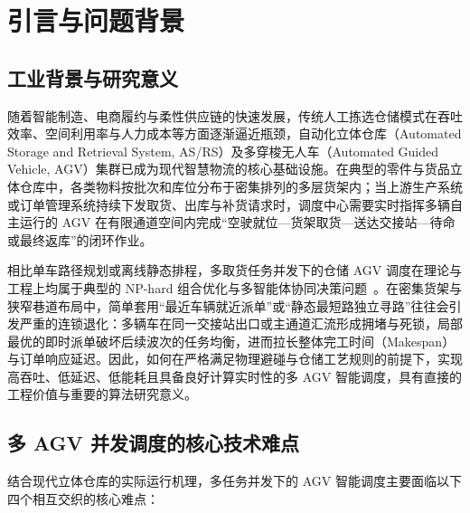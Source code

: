 \section{引言与问题背景}
\label{sec:introduction}

\subsection{工业背景与研究意义}

随着智能制造、电商履约与柔性供应链的快速发展，传统人工拣选仓储模式在吞吐效率、空间利用率与人力成本等方面逐渐逼近瓶颈，自动化立体仓库（Automated Storage and Retrieval System, AS/RS）及多穿梭无人车（Automated Guided Vehicle, AGV）集群已成为现代智慧物流的核心基础设施。在典型的零件与货品立体仓库中，各类物料按批次和库位分布于密集排列的多层货架内；当上游生产系统或订单管理系统持续下发取货、出库与补货请求时，调度中心需要实时指挥多辆自主运行的 AGV 在有限通道空间内完成“空驶就位—货架取货—送达交接站—待命或最终返库”的闭环作业。

相比单车路径规划或离线静态排程，多取货任务并发下的仓储 AGV 调度在理论与工程上均属于典型的 NP-hard 组合优化与多智能体协同决策问题~\cite{ma2017lifelong, stern2019mapf}。在密集货架与狭窄巷道布局中，简单套用“最近车辆就近派单”或“静态最短路独立寻路”往往会引发严重的连锁退化：多辆车在同一交接站出口或主通道汇流形成拥堵与死锁，局部最优的即时派单破坏后续波次的任务均衡，进而拉长整体完工时间（Makespan）与订单响应延迟。因此，如何在严格满足物理避碰与仓储工艺规则的前提下，实现高吞吐、低延迟、低能耗且具备良好计算实时性的多 AGV 智能调度，具有直接的工程价值与重要的算法研究意义。

\subsection{多 AGV 并发调度的核心技术难点}

结合现代立体仓库的实际运行机理，多任务并发下的 AGV 智能调度主要面临以下四个相互交织的核心难点：


